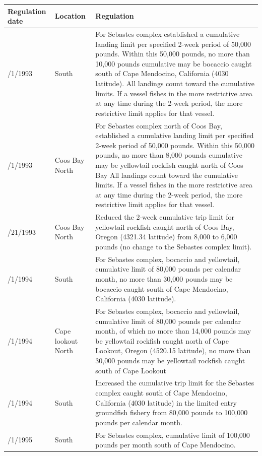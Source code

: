 \documentclass[12pt,]{article}
\begin{document}
\begin{tabular}{>{\centering}p{.60in}>{\centering}p{1.0in}>{\raggedright}p{4.20in}}
  \hline
Regulation date & Location & Regulation \\ 
  \hline
1/1/1993 & 4030 South & For Sebastes complex established a cumulative landing limit per specified 2-week period of 50,000 pounds.  Within this 50,000 pounds, no more than 10,000 pounds cumulative may be bocaccio caught south of Cape Mendocino, California (4030 latitude).  All landings count toward the cumulative limits.  If a vessel fishes in the more restrictive area at any time during the 2-week period, the more restrictive limit applies for that vessel. \\ 
  1/1/1993 & Coos Bay North & For Sebastes complex north of Coos Bay, established a cumulative landing limit per specified 2-week period of 50,000 pounds.  Within this 50,000 pounds, no more than 8,000 pounds cumulative may be yellowtail rockfish caught north of Coos Bay    All landings count toward the cumulative limits.  If a vessel fishes in the more restrictive area at any time during the 2-week period, the more restrictive limit applies for that vessel. \\ 
  4/21/1993 & Coos Bay North & Reduced the 2-week cumulative trip limit for yellowtail rockfish caught north of Coos Bay, Oregon (4321.34 latitude) from 8,000 to 6,000 pounds (no change to the Sebastes complex limit). \\ 
  1/1/1994 & 4030 South & For Sebastes complex, bocaccio  and yellowtail,  cumulative limit of 80,000 pounds per calendar month, no more than 30,000 pounds may be bocaccio caught south of Cape Mendocino, California (4030 latitude). \\ 
  1/1/1994 & Cape lookout North & For Sebastes complex, bocaccio  and yellowtail,  cumulative limit of 80,000 pounds per calendar month, of which no more than 14,000 pounds may be yellowtail rockfish caught north of Cape Lookout, Oregon (4520.15 latitude), no more than 30,000 pounds may be yellowtail rockfish caught south of Cape Lookout \\ 
  9/1/1994 & 4030 South & Increased the cumulative trip limit for the Sebastes complex caught south of Cape Mendocino, California (4030 latitude) in the limited entry groundfish fishery from 80,000 pounds to 100,000 pounds per calendar month. \\ 
  1/1/1995 & 4030 South & For Sebastes complex, cumulative limit of 100,000 pounds per month south of Cape Mendocino.   \\ 

\end{tabular}
\end{document}
